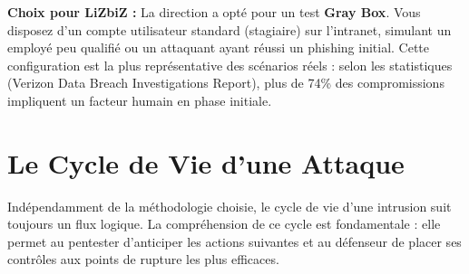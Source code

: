 \begin{boxlizbiz}
\textbf{Choix pour LiZbiZ :}
La direction a opté pour un test \textbf{Gray Box}. Vous disposez d'un compte
utilisateur standard (\og{}stagiaire\fg{}) sur l'intranet, simulant un employé
peu qualifié ou un attaquant ayant réussi un phishing initial. Cette configuration
est la plus représentative des scénarios réels : selon les statistiques 
(Verizon Data Breach Investigations Report), plus de 74\% des compromissions
impliquent un facteur humain en phase initiale.
\end{boxlizbiz}

\section{Le Cycle de Vie d'une Attaque}
\label{sec:cycle_vie}

Indépendamment de la méthodologie choisie, le cycle de vie d'une intrusion suit
toujours un flux logique. La compréhension de ce cycle est fondamentale : elle
permet au pentester d'anticiper les actions suivantes et au défenseur de placer
ses contrôles aux points de rupture les plus efficaces.

